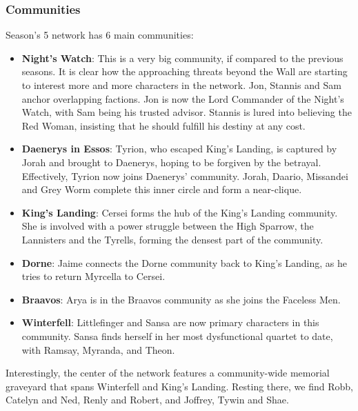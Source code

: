 \documentclass[10pt,twocolumn,letterpaper]{article}
\begin{document}
\subsubsection{Communities}

Season's 5 network has 6 main communities:

\begin{itemize}
    \item \textbf{Night's Watch}: This is a very big community, if compared to the previous seasons. It is clear how the approaching threats beyond the Wall are starting to interest more and more characters in the network. Jon, Stannis and Sam anchor overlapping factions. Jon is now the Lord Commander of the Night's Watch, with Sam being his trusted advisor. Stannis is lured into believing the Red Woman, insisting that he should fulfill his destiny at any cost. 
    \item \textbf{Daenerys in Essos}: Tyrion, who escaped King's Landing, is captured by Jorah and brought to Daenerys, hoping to be forgiven by the betrayal. Effectively, Tyrion now joins Daenerys' community. Jorah, Daario, Missandei and Grey Worm complete this inner circle and form a near-clique.
    \item \textbf{King's Landing}: Cersei forms the hub of the King’s Landing community. She is involved with a power struggle between the High Sparrow, the Lannisters and the Tyrells, forming the densest part of the community. 
    \item \textbf{Dorne}: Jaime connects the Dorne community back to King's Landing, as he tries to return Myrcella to Cersei.
    \item \textbf{Braavos}: Arya is in the Braavos community as she joins the Faceless Men. 
    \item \textbf{Winterfell}: Littlefinger and Sansa are now primary characters in this community. Sansa finds herself in her most dysfunctional quartet to date, with Ramsay, Myranda, and Theon.
\end{itemize}

Interestingly, the center of the network features a community-wide memorial graveyard that spans Winterfell and King’s Landing. Resting there, we find Robb, Catelyn and Ned, Renly and Robert, and Joffrey, Tywin and Shae.
\end{document}

